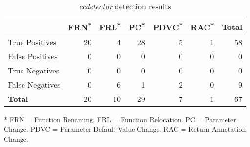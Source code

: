 \begin{table}[!t]
    \caption{\textit{ccdetector} detection results}
    \label{tab:detect-result}
    \begin{threeparttable}
        \centering
        \renewcommand{\arraystretch}{1.2}
        \setlength\tabcolsep{8.3pt}
        \begin{tabular*}{\linewidth}{l|rrrrrr}
            \toprule
            & \textbf{FRN\textsuperscript{*}} & \textbf{FRL\textsuperscript{*}} & \textbf{PC\textsuperscript{*}} & \textbf{PDVC\textsuperscript{*}} & \textbf{RAC\textsuperscript{*}} & \textbf{Total} \\
            \midrule
            True Positives  & 20 & 4  & 28 & 5 & 1 & 58 \\
            False Positives & 0  & 0  & 0  & 0 & 0 & 0  \\
            True Negatives  & 0  & 0  & 0  & 0 & 0 & 0  \\
            False Negatives & 0  & 6  & 1  & 2 & 0 & 9  \\
            \midrule
            \textbf{Total}  & 20 & 10 & 29 & 7 & 1 & 67\\
            \bottomrule
        \end{tabular*}
        \begin{tablenotes}
            \item [*] {\scriptsize FRN = Function Renaming. FRL = Function Relocation. PC = Parameter Change. PDVC = Parameter Default Value Change. RAC = Return Annotation Change.}
        \end{tablenotes}
    \end{threeparttable}
    \vspace{-5mm}
\end{table}

\newpage

\begin{figure}[!t]
    
    \vspace{-5mm}
\end{figure}

\begin{figure}[!t]
    
    \vspace{-5mm}
\end{figure}

